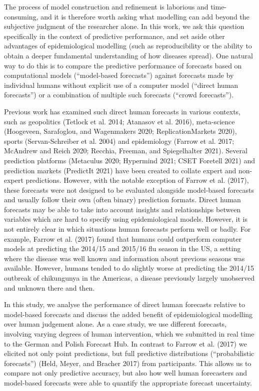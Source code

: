 \documentclass[
]{article}
\begin{document}
The process of model construction and refinement is laborious and time-consuming, and it is therefore worth asking what modelling can add beyond the subjective judgment of the researcher alone. In this work, we ask this question specifically in the context of predictive performance, and set aside other advantages of epidemiological modelling (such as reproducibility or the ability to obtain a deeper fundamental understanding of how diseases spread). One natural way to do this is to compare the predictive performance of forecasts based on computational models (``model-based forecasts'') against forecasts made by individual humans without explicit use of a computer model (``direct human forecasts'') or a combination of multiple such forecasts (``crowd forecasts'').

Previous work has examined such direct human forecasts in various contexts, such as geopolitics (Tetlock et al. 2014; Atanasov et al. 2016), meta-science (Hoogeveen, Sarafoglou, and Wagenmakers 2020; ReplicationMarkets 2020), sports (Servan-Schreiber et al. 2004) and epidemiology (Farrow et al. 2017; McAndrew and Reich 2020; Recchia, Freeman, and Spiegelhalter 2021). Several prediction platforms (Metaculus 2020; Hypermind 2021; CSET Foretell 2021) and prediction markets (PredictIt 2021) have been created to collate expert and non-expert predictions. However, with the notable exception of Farrow et al. (2017), these forecasts were not designed to be evaluated alongside model-based forecasts and usually follow their own (often binary) prediction formats. Direct human forecasts may be able to take into account insights and relationships between variables which are hard to specify using epidemiological models. However, it is not entirely clear in which situations human forecasts perform well or badly. For example, Farrow et al. (2017) found that humans could outperform computer models at predicting the 2014/15 and 2015/16 flu season in the US, a setting where the disease was well known and information about previous seasons was available. However, humans tended to do slightly worse at predicting the 2014/15 outbreak of chikungunya in the Americas, a disease previously largely unobserved and unknown there and then.

In this study, we analyse the performance of direct human forecasts relative to model-based forecasts and discuss the added benefit of epidemiological modelling over human judgement alone. As a case study, we use different forecasts, involving varying degrees of human intervention, which we submitted in real time to the German and Polish Forecast Hub. In contrast to Farrow et al. (2017) we elicited not only point predictions, but full predictive distributions (``probabilistic forecasts'') (Held, Meyer, and Bracher 2017) from participants. This allows us to compare not only predictive accuracy, but also how well human forecasters and model-based forecasts were able to quantify the appropriate forecast uncertainty.
\end{document}
